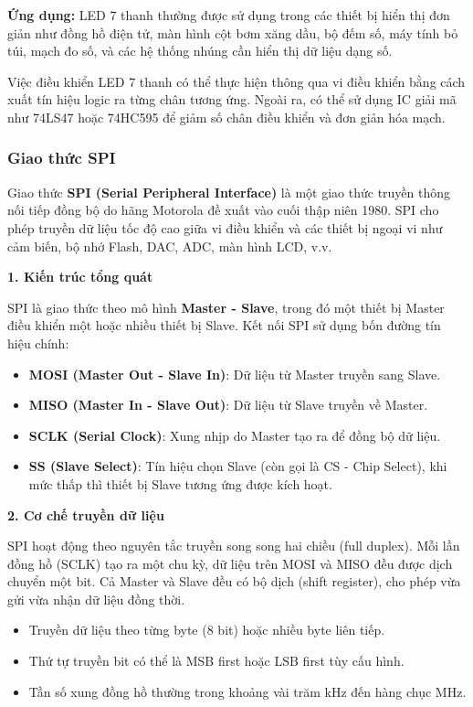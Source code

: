\textbf{Ứng dụng:} LED 7 thanh thường được sử dụng trong các thiết bị hiển thị đơn giản như đồng hồ điện tử, màn hình cột bơm xăng dầu, bộ đếm số, máy tính bỏ túi, mạch đo số, và các hệ thống nhúng cần hiển thị dữ liệu dạng số.

Việc điều khiển LED 7 thanh có thể thực hiện thông qua vi điều khiển bằng cách xuất tín hiệu logic ra từng chân tương ứng. Ngoài ra, có thể sử dụng IC giải mã như 74LS47 hoặc 74HC595 để giảm số chân điều khiển và đơn giản hóa mạch.


\subsubsection{Giao thức SPI }

Giao thức \textbf{SPI\cite{st_rm_f4} (Serial Peripheral Interface) } là một giao thức truyền thông nối tiếp đồng bộ do hãng Motorola đề xuất vào cuối thập niên 1980. SPI cho phép truyền dữ liệu tốc độ cao giữa vi điều khiển và các thiết bị ngoại vi như cảm biến, bộ nhớ Flash, DAC, ADC, màn hình LCD, v.v.

\textbf{1. Kiến trúc tổng quát}

SPI là giao thức theo mô hình \textbf{Master - Slave}, trong đó một thiết bị Master điều khiển một hoặc nhiều thiết bị Slave. Kết nối SPI sử dụng bốn đường tín hiệu chính:

\begin{itemize}
    \item \textbf{MOSI (Master Out - Slave In)}: Dữ liệu từ Master truyền sang Slave.
    \item \textbf{MISO (Master In - Slave Out)}: Dữ liệu từ Slave truyền về Master.
    \item \textbf{SCLK (Serial Clock)}: Xung nhịp do Master tạo ra để đồng bộ dữ liệu.
    \item \textbf{SS (Slave Select)}: Tín hiệu chọn Slave (còn gọi là CS - Chip Select), khi mức thấp thì thiết bị Slave tương ứng được kích hoạt.
\end{itemize}


\textbf{2. Cơ chế truyền dữ liệu}

SPI hoạt động theo nguyên tắc truyền song song hai chiều (full duplex). Mỗi lần đồng hồ (SCLK) tạo ra một chu kỳ, dữ liệu trên MOSI và MISO đều được dịch chuyển một bit. Cả Master và Slave đều có bộ dịch (shift register), cho phép vừa gửi vừa nhận dữ liệu đồng thời.

\begin{itemize}
    \item Truyền dữ liệu theo từng byte (8 bit) hoặc nhiều byte liên tiếp.
    \item Thứ tự truyền bit có thể là MSB first hoặc LSB first tùy cấu hình.
    \item Tần số xung đồng hồ thường trong khoảng vài trăm kHz đến hàng chục MHz.
\end{itemize}

